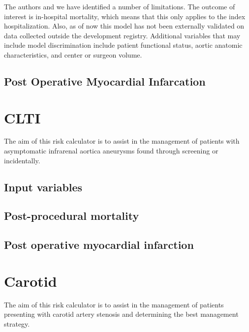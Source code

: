 \documentclass[
]{book}
\begin{document}
The authors and we have identified a number of limitations. The outcome of interest is in-hospital mortality, which means that this only applies to the index hospitalization. Also, as of now this model has not been externally validated on data collected outside the development registry. Additional variables that may include model discrimination include patient functional status, aortic anatomic characteristics, and center or surgeon volume.

\hypertarget{post-operative-myocardial-infarcation}{%
\section{Post Operative Myocardial Infarcation}\label{post-operative-myocardial-infarcation}}

\hypertarget{clti}{%
\chapter{CLTI}\label{clti}}

The aim of this risk calculator is to assist in the management of patients with asymptomatic infrarenal aortica aneurysms found through screening or incidentally.

\hypertarget{input-variables-1}{%
\section{Input variables}\label{input-variables-1}}

\hypertarget{post-procedural-mortality}{%
\section{Post-procedural mortality}\label{post-procedural-mortality}}

\hypertarget{post-operative-myocardial-infarction}{%
\section{Post operative myocardial infarction}\label{post-operative-myocardial-infarction}}

\hypertarget{carotid}{%
\chapter{Carotid}\label{carotid}}

The aim of this risk calculator is to assist in the management of patients presenting with carotid artery stenosis and determining the best management strategy.
\end{document}

